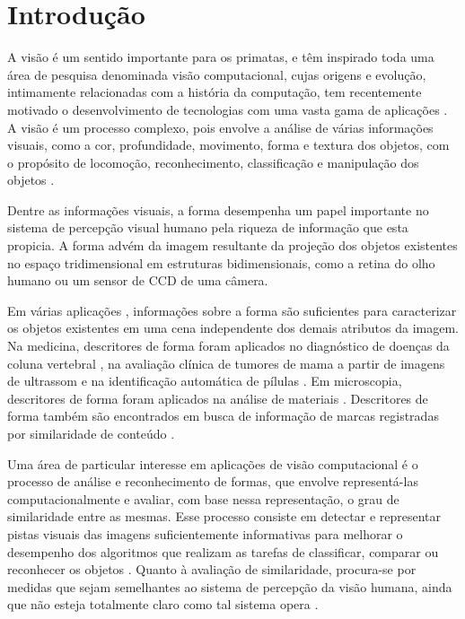 
\chapter{Introdução \label{chap:INTRO}}


A visão é um sentido importante para os primatas, e têm inspirado toda uma área de pesquisa denominada visão computacional, cujas origens e evolução, intimamente relacionadas com a história da computação, tem recentemente motivado o desenvolvimento de tecnologias com uma vasta gama de aplicações \cite{Costa:2009}. A visão é um processo complexo, pois envolve a análise de várias informações visuais, como a cor, profundidade, movimento, forma e textura dos objetos, com o propósito de locomoção, reconhecimento, classificação e manipulação dos objetos \cite{Ullman:1996}.

Dentre as informações visuais, a forma desempenha um papel importante no sistema de percepção visual humano pela riqueza de informação que esta propicia. A forma advém da imagem resultante da projeção dos objetos existentes no espaço tridimensional em estruturas bidimensionais, como a retina do olho humano ou um sensor de \acf{CCD}  de uma câmera.

Em várias aplicações \cite{Zhang201661,Zhao20153203}, informações sobre a forma são suficientes para caracterizar os objetos existentes em uma cena independente dos demais atributos da imagem. Na medicina, descritores de forma foram aplicados no diagnóstico de doenças da coluna vertebral \cite{Lee:2009}, na avaliação clínica de tumores de mama a partir de imagens de ultrassom \cite{Yang:2009} e na identificação automática de pílulas \cite{Ushizima:2015}. Em microscopia, descritores de forma foram aplicados na análise de materiais \cite{Zhang201661}. Descritores de forma também são encontrados em busca de informação de marcas registradas por similaridade de conteúdo \cite{MohdAnuar2013105,Qi20102017}.

Uma área de particular interesse em aplicações de visão computacional é o processo de análise e reconhecimento de formas, que envolve representá-las computacionalmente e avaliar, com base nessa representação, o grau de similaridade entre as mesmas. Esse processo consiste em detectar e representar pistas visuais das imagens suficientemente informativas para melhorar o desempenho dos algoritmos que realizam as tarefas de classificar, comparar ou reconhecer os objetos \cite{Escolano:2009}. Quanto à avaliação de similaridade, procura-se por medidas que sejam semelhantes ao sistema de percepção da visão humana, ainda que não esteja totalmente claro como tal sistema opera \cite{4815272}. 

